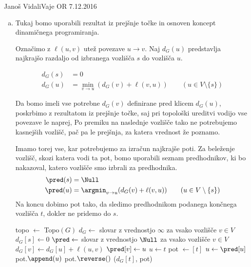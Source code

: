 \begin{naloga}{Janoš Vidali}{Vaje OR 7.12.2016}
\begin{odgovor}
\begin{enumerate}[(a)]
Klicu {\sc Topo}$(G)$ nam vrne ureditev vozlišč $[g, a, h, b, c, f, d, e]$.

\item Tukaj bomo uporabili rezultat iz prejšnje točke
in osnoven koncept dinamičnega programiranja.

Označimo z $\ell(u, v)$ utež povezave $u \rightarrow v$.
Naj $d_G(u)$ predstavlja najkrajšo razdaljo
od izbranega vozlišča $s$ do vozlišča $u$.

\begin{align*}
d_G(s) &= 0 \\
d_G(u) &= \min_{v \rightarrow u}(d_G(v) + \ell(v, u))
\qquad (u \in V \setminus \{s\})
\end{align*}

Da bomo imeli vse potrebne $d_G(v)$ definirane pred klicem $d_G(u)$,
poskrbimo z rezultatom iz prejšnje točke,
saj pri topološki ureditvi vodijo vse povezave le naprej,
Po premiku na naslednje vozlišče tako ne potrebujemo kasnejših vozlišč,
pač pa le prejšnja, za katera vrednost že poznamo.

Imamo torej vse, kar potrebujemo za izračun najkrajše poti.
Za beleženje vozlišč, skozi katera vodi ta pot,
bomo uporabili seznam predhodnikov,
ki bo nakazoval, katero vozlišče smo izbrali za predhodnika.
\begin{align*}
\pred(s) &= \Null \\
\pred(u) &= \argmin_{v \rightarrow u}(d_G(v) + \ell(v, u))
\qquad (u \in V \setminus \{s\})
\end{align*}
Na koncu dobimo pot tako,
da sledimo predhodnikom podanega končnega vozlišča $t$,
dokler ne pridemo do $s$.

\begin{small}
\begin{algorithmic}
	\State topo $\gets$ {\sc Topo}$(G)$
	\State $d_G \gets$ slovar z vrednostjo $\infty$ za vsako vozlišče $v \in V$
	\State $d_G[s] \gets 0$
	\State $\pred \gets$ slovar z vrednostjo $\Null$ za vsako vozlišče $v \in V$
				\State $d_G[v] \gets d_G[u] + \ell(u, v)$
				\State $\pred[v] \gets u$
			\EndIf
		\EndFor
	\EndFor
    \State $u \gets t$
	\State pot $\gets [t]$
	\While{$\pred[u] \ne \Null$}
        \State $u \gets \pred[u]$
		\State pot.$\append(u)$
	\EndWhile
    \State pot.$\reverse()$
	\State \Return ($d_G[t]$, pot)
\EndFunction 
\end{algorithmic}
\end{small}


\end{enumerate}
\end{odgovor}
\end{naloga}
